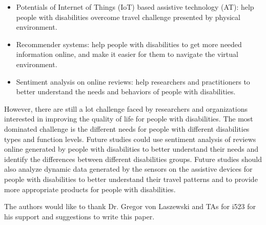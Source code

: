 \begin{itemize}
  \item Potentials of Internet of Things (IoT) based assistive technology (AT): help people with disabilities overcome travel challenge presented by physical environment.
  \item Recommender systems: help people with disabilities to get more needed information online, and make it easier for them to navigate the virtual environment.
  \item Sentiment analysis on online reviews: help researchers and practitioners to better understand the needs and behaviors of people with disabilities. 
\end{itemize}

However, there are still a lot challenge faced by researchers and organizations interested in
improving the quality of life for people with disabilities. The most dominated challenge is
the different needs for people with different disabilities types and function levels. Future
studies could use sentiment analysis of reviews online generated by people with disabilities 
to better understand their needs and identify the differences between different disabilities
groups. Future studies should also analyze dynamic data generated by the sensors on the 
assistive devices for people with disabilities to better understand their travel patterns
and to provide more appropriate products for people with disabilities. 

\begin{acks}

  The authors would like to thank Dr. Gregor von Laszewski and TAs for i523 for his
  support and suggestions to write this paper.

\end{acks}


 

\appendix
